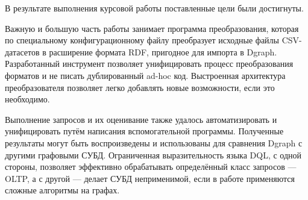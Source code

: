 
В результате выполнения курсовой работы поставленные цели были достигнуты.

Важную и большую часть работы занимает программа преобразования, которая по специальному конфигурационному файлу
преобразует исходные файлы CSV-датасетов в расширение формата RDF, пригодное для импорта в Dgraph. Разработанный
инструмент позволяет унифицировать процесс преобразования форматов и не писать дублированный ad-hoc код. Выстроенная
архитектура преобразователя позволяет легко добавлять новые возможности, если это необходимо.

Выполнение запросов и их оценивание также удалось автоматизировать и унифицировать путём написания вспомогательной
программы. Полученные результаты могут быть воспроизведены и использованы для сравнения Dgraph с другими графовыми СУБД.
Ограниченная выразительность языка DQL, с одной стороны, позволяет эффективно обрабатывать определённый класс запросов
--- OLTP, а с другой --- делает СУБД неприменимой, если в работе применяются сложные алгоритмы на графах.
